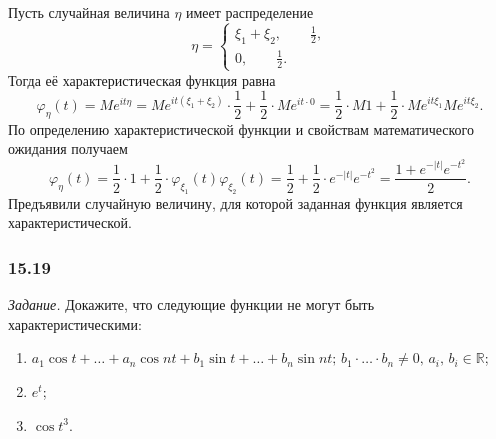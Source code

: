 \begin{enumerate}[label=\alph*)]
Пусть случайная величина $ \eta $ имеет распределение
$$ \eta =
\begin{cases}
\xi_1 + \xi_2, \qquad \frac{1}{2}, \\
0, \qquad \frac{1}{2}.
\end{cases}$$
Тогда её характеристическая функция равна
$$ \varphi_{ \eta } \left( t \right) =
Me^{it \eta } =
Me^{it \left( \xi_1 + \xi_2 \right) } \cdot \frac{1}{2} + \frac{1}{2} \cdot Me^{it \cdot 0} =
\frac{1}{2} \cdot M1 + \frac{1}{2} \cdot Me^{it \xi_1} Me^{it \xi_2}.$$
По определению характеристической функции и свойствам математического ожидания получаем
$$ \varphi_{ \eta } \left( t \right) =
\frac{1}{2} \cdot 1 + \frac{1}{2} \cdot \varphi_{ \xi_1} \left( t \right) \varphi_{ \xi_2} \left( t \right) =
\frac{1}{2} + \frac{1}{2} \cdot e^{- \left| t \right| }e^{- t^2} =
\frac{1 + e^{- \left| t \right| }e^{- t^2}}{2}.$$
Предъявили случайную величину, для которой заданная функция является характеристической.
\end{enumerate}

\subsubsection*{15.19}

\textit{Задание.} Докажите, что следующие функции не могут быть характеристическими:
\begin{enumerate}[label=\alph*)]
\item $a_1 \cos t + \dotsc + a_n \cos nt + b_1 \sin t + \dotsc + b_n \sin nt; \, b_1 \cdot \dotsc \cdot b_n \neq 0, \, a_i, \, b_i \in \mathbb{R}$;
\item $e^t$;
\item $ \cos t^3$.
\end{enumerate}

